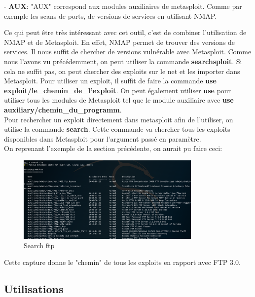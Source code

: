 - \textbf{AUX}: "AUX" correspond aux modules auxiliaires de metasploit. Comme par exemple les scans de ports, de versions de services en utilisant NMAP.

Ce qui peut être très intéressant avec cet outil, c'est de combiner l'utilisation de NMAP et de Metasploit. En effet, NMAP permet de trouver des versions de services. Il nous suffit de chercher de versions vulnérable avec Metasploit. Comme nous l'avons vu précédemment, on peut utiliser la commande \textbf{searchsploit}. Si cela ne suffit pas, on peut chercher des exploits sur le net et les importer dans Metasploit. Pour utiliser un exploit, il suffit de faire la commande \textbf{use exploit/le\_chemin\_de\_l'exploit}. On peut également utiliser \textbf{use} pour utiliser tous les modules de Metasploit tel que le module auxiliaire avec \textbf{use auxiliary/chemin\_du\_programm}.\\

Pour rechercher un exploit directement dans metasploit afin de l'utiliser, on utilise la commande \textbf{search}. Cette commande va chercher tous les exploits disponibles dans Metasploit pour l'argument passé en paramètre.\\ 

 On reprenant l'exemple de la section précédente, on aurait pu faire ceci:

\begin{figure}[htp!]
  \centering
  \setlength\figureheight{7cm}
  \setlength\figurewidth{9cm}
  \includegraphics[width=0.8\textwidth]{oui/Ancien/imangeancien/metasploit/search.PNG}
  \caption{Search ftp}
  \label{fig:courbe-tikz}
\end{figure}

Cette capture donne le "chemin" de tous les exploits en rapport avec FTP 3.0.

\subsection{Utilisations}

